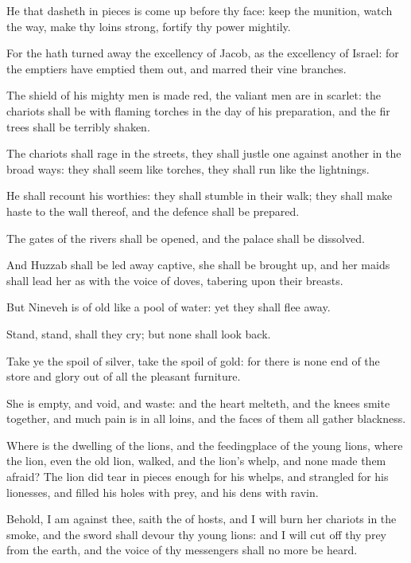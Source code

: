 \Chapter
\Verse He that dasheth in pieces is come up before thy face: keep the munition, watch the way, make thy loins strong, fortify thy power mightily.

\Verse For the \LORD hath turned away the excellency of Jacob, as the excellency of Israel: for the emptiers have emptied them out, and marred their vine branches.

\Verse The shield of his mighty men is made red, the valiant men are in scarlet: the chariots shall be with flaming torches in the day of his preparation, and the fir trees shall be terribly shaken.

\Verse The chariots shall rage in the streets, they shall justle one against another in the broad ways: they shall seem like torches, they shall run like the lightnings.

\Verse He shall recount his worthies: they shall stumble in their walk; they shall make haste to the wall thereof, and the defence shall be prepared.

\Verse The gates of the rivers shall be opened, and the palace shall be dissolved.

\Verse And Huzzab shall be led away captive, she shall be brought up, and her maids shall lead her as with the voice of doves, tabering upon their breasts.

\Verse But Nineveh is of old like a pool of water: yet they shall flee away.

Stand, stand, shall they cry; but none shall look back.

\Verse Take ye the spoil of silver, take the spoil of gold: for there is none end of the store and glory out of all the pleasant furniture.

\Verse She is empty, and void, and waste: and the heart melteth, and the knees smite together, and much pain is in all loins, and the faces of them all gather blackness.

\Verse Where is the dwelling of the lions, and the feedingplace of the young lions, where the lion, even the old lion, walked, and the lion's whelp, and none made them afraid?  \Verse The lion did tear in pieces enough for his whelps, and strangled for his lionesses, and filled his holes with prey, and his dens with ravin.

\Verse Behold, I am against thee, saith the \LORD of hosts, and I will burn her chariots in the smoke, and the sword shall devour thy young lions: and I will cut off thy prey from the earth, and the voice of thy messengers shall no more be heard.


